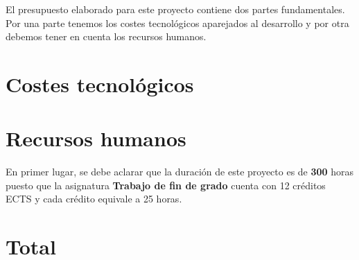 


El presupuesto elaborado para este proyecto contiene dos partes fundamentales. Por una parte tenemos los costes tecnológicos aparejados al desarrollo y por otra debemos tener en cuenta los recursos humanos.

\section{Costes tecnológicos}
\label{7:sec:1}



\section{Recursos humanos}
\label{7:sec:2}

En primer lugar, se debe aclarar que la duración de este proyecto es de \textbf{300} horas puesto que la asignatura \textbf{Trabajo de fin de grado} cuenta con 12 créditos ECTS y cada crédito equivale a 25 horas. 



\section{Total}
\label{7:sec:3}



